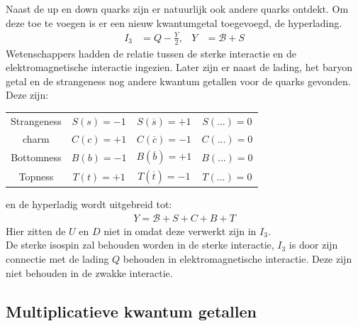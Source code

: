 \documentclass[../main.tex]{subfiles}
\begin{document}
Naast de up en down quarks zijn er natuurlijk ook andere quarks ontdekt. Om deze toe te voegen is er een nieuw kwantumgetal toegevoegd, de hyperlading.
\begin{equation}
    \begin{aligned}
        \label{eq:hyperlading}
        I_3&=Q-\frac{Y}{2},& Y&=\mathcal{B}+S
    \end{aligned}
\end{equation}
Wetenschappers hadden de relatie tussen de sterke interactie en de elektromagnetische interactie ingezien. Later zijn er naast de lading, het baryon getal en de strangeness nog andere kwantum getallen voor de quarks gevonden. Deze zijn:

\begin{table}[h]
    \centering
    \label{tab:kwantum_getallen}
    \begin{tabular}{cccc}
        Strangeness & $S(s)=-1$ & $S(\overline s)=+1$   & $S(...)=0$    \\
        charm       & $C(c)=+1$ & $C(\overline c)=-1$   & $C(...)=0$    \\
        Bottomness  & $B(b)=-1$ & $B(\overline b)=+1$   & $B(...)=0$    \\
        Topness     & $T(t)=+1$ & $T(\overline t)=-1$   & $T(...)=0$
    \end{tabular}
\end{table}

en de hyperladig wordt uitgebreid tot:
\begin{equation}
    \begin{aligned}
        \label{eq:hyperlading_total}
        Y=\mathcal{B}+S+C+B+T
    \end{aligned}
\end{equation}
Hier zitten de $U$ en $D$ niet in omdat deze verwerkt zijn in $I_3$.\\
De sterke isospin zal behouden worden in de sterke interactie, $I_3$ is door zijn connectie met de lading $Q$ behouden in elektromagnetische interactie. Deze zijn niet behouden in de zwakke interactie.

\subsection{Multiplicatieve kwantum getallen}%
\label{sub:multiplicatieve_kwantum_getallen}
\end{document}
